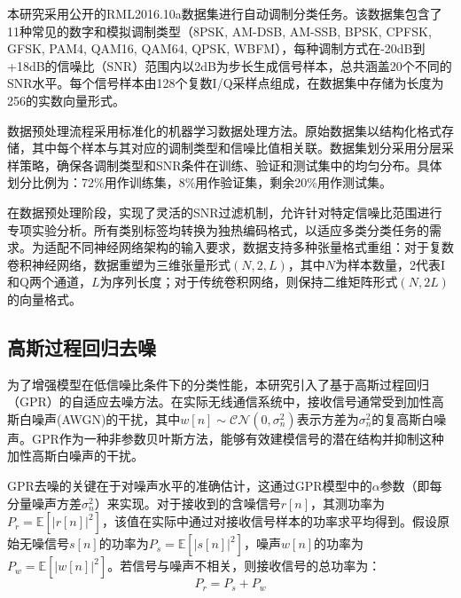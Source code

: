 \documentclass[conference]{IEEEtran}
\begin{document}
本研究采用公开的RML2016.10a数据集进行自动调制分类任务。该数据集包含了11种常见的数字和模拟调制类型（8PSK, AM-DSB, AM-SSB, BPSK, CPFSK, GFSK, PAM4, QAM16, QAM64, QPSK, WBFM），每种调制方式在-20dB到+18dB的信噪比（SNR）范围内以2dB为步长生成信号样本，总共涵盖20个不同的SNR水平。每个信号样本由128个复数I/Q采样点组成，在数据集中存储为长度为256的实数向量形式。

数据预处理流程采用标准化的机器学习数据处理方法。原始数据集以结构化格式存储，其中每个样本与其对应的调制类型和信噪比值相关联。数据集划分采用分层采样策略，确保各调制类型和SNR条件在训练、验证和测试集中的均匀分布。具体划分比例为：72\%用作训练集，8\%用作验证集，剩余20\%用作测试集。

在数据预处理阶段，实现了灵活的SNR过滤机制，允许针对特定信噪比范围进行专项实验分析。所有类别标签均转换为独热编码格式，以适应多类分类任务的需求。为适配不同神经网络架构的输入要求，数据支持多种张量格式重组：对于复数卷积神经网络，数据重塑为三维张量形式$(N, 2, L)$，其中$N$为样本数量，2代表I和Q两个通道，$L$为序列长度；对于传统卷积网络，则保持二维矩阵形式$(N, 2L)$的向量格式。

\subsection{高斯过程回归去噪}

为了增强模型在低信噪比条件下的分类性能，本研究引入了基于高斯过程回归（GPR）的自适应去噪方法。在实际无线通信系统中，接收信号通常受到加性高斯白噪声(AWGN)的干扰，其中$w[n] \sim \mathcal{CN}(0, \sigma_n^2)$表示方差为$\sigma_n^2$的复高斯白噪声。GPR作为一种非参数贝叶斯方法，能够有效建模信号的潜在结构并抑制这种加性高斯白噪声的干扰。

GPR去噪的关键在于对噪声水平的准确估计，这通过GPR模型中的$\alpha$参数（即每分量噪声方差$\sigma_n^2$）来实现。对于接收到的含噪信号$r[n]$，其测功率为$P_r = \mathbb{E}[|r[n]|^2]$，该值在实际中通过对接收信号样本的功率求平均得到。假设原始无噪信号$s[n]$的功率为$P_s = \mathbb{E}[|s[n]|^2]$，噪声$w[n]$的功率为$P_w = \mathbb{E}[|w[n]|^2]$。若信号与噪声不相关，则接收信号的总功率为：
\begin{equation}
P_r = P_s + P_w
\end{equation}
\end{document}
